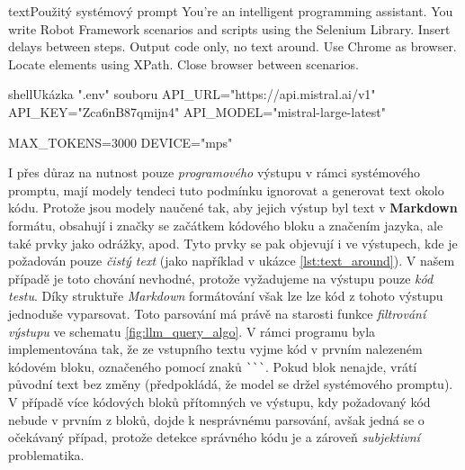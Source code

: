 \documentclass[czech, ma, kiv, he, iso690alph, pdf, viewonly]{fasthesis}
\begin{document}
        \begin{code}{text}{Použitý systémový prompt \label{lst:system_prompt_used}}
You're an intelligent programming assistant. You write Robot Framework scenarios and scripts using the Selenium Library. Insert delays between steps. Output code only, no text around. Use Chrome as browser. Locate elements using XPath. Close browser between scenarios.
        \end{code}

        \begin{code}{shell}{Ukázka ".env" souboru \label{lst:dot_env}}
API_URL="https://api.mistral.ai/v1"
API_KEY="Zca6nB87qmijn4"
API_MODEL="mistral-large-latest"

MAX_TOKENS=3000
DEVICE="mps"
        \end{code}

        I přes důraz na nutnost pouze \textit{programového} výstupu v rámci systémového promptu, mají modely tendeci tuto podmínku ignorovat a generovat text okolo kódu. Protože jsou modely naučené tak, aby jejich výstup byl text v \textbf{Markdown} formátu, obsahují i značky se začátkem kódového bloku a značením jazyka, ale také prvky jako odrážky, apod. Tyto prvky se pak objevují i ve výstupech, kde je požadován pouze \textit{čistý text} (jako například v ukázce \ref{lst:text_around}). V našem případě je toto chování nevhodné, protože vyžadujeme na výstupu pouze \textit{kód testu}. Díky struktuře \textit{Markdown} formátování však lze lze kód z tohoto výstupu jednoduše vyparsovat. Toto parsování má právě na starosti funkce \textit{filtrování výstupu} ve schematu \ref{fig:llm_query_algo}. V rámci programu byla implementována tak, že ze vstupního textu vyjme kód v prvním nalezeném kódovém bloku, označeného pomocí znaků \verb|```|. Pokud blok nenajde, vrátí původní text bez změny (předpokládá, že model se držel systémového promptu). V případě více kódových bloků přítomných ve výstupu, kdy požadovaný kód nebude v prvním z bloků, dojde k nesprávnému parsování, avšak jedná se o očekávaný případ, protože detekce správného kódu je  a zároveň \textit{subjektivní} problematika.
\end{document}
